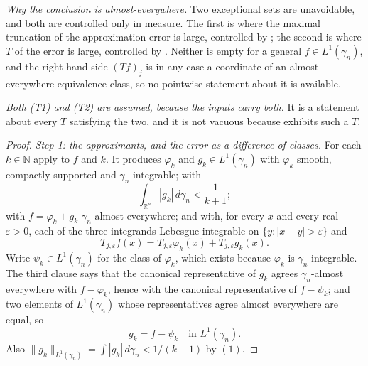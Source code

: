 \begin{lemma}
\emph{Why the conclusion is almost-everywhere.}  Two exceptional sets are
unavoidable, and both are controlled only in measure.  The first is where the
maximal truncation of the approximation error is large, controlled by
; the second is where $T$ of the error is
large, controlled by .  Neither is empty for a
general $f \in L^1(\gamma_n)$, and the right-hand side $(Tf)_j$ is in any case
a coordinate of an almost-everywhere equivalence class, so no pointwise
statement about it is available.

\emph{Both (T1) and (T2) are assumed, because the inputs carry both.}  It is a
statement about every $T$ satisfying the two, and it is not vacuous because
 exhibits such a $T$.
\end{lemma}
\begin{proof}
\emph{Step 1: the approximants, and the error as a difference of classes.}
For each $k \in \mathbb{N}$ apply  to
$f$ and $k$.  It produces $\varphi_k$ and $g_k \in L^1(\gamma_n)$ with
$\varphi_k$ smooth, compactly supported and $\gamma_n$-integrable; with
\begin{equation*}
  \int_{\mathbb{R}^n}|g_k|\,d\gamma_n < \frac1{k+1} ; \tag{1}
\end{equation*}
with $f = \varphi_k + g_k$ $\gamma_n$-almost everywhere; and with, for every
$x$ and every real $\varepsilon > 0$, each of the three integrands Lebesgue
integrable on $\{y : |x-y| > \varepsilon\}$ and
\begin{equation*}
  T_{j,\varepsilon}f(x)
    = T_{j,\varepsilon}\varphi_k(x) + T_{j,\varepsilon}g_k(x) . \tag{2}
\end{equation*}
Write $\psi_k \in L^1(\gamma_n)$ for the class of $\varphi_k$, which exists
because $\varphi_k$ is $\gamma_n$-integrable.  The third clause says that the
canonical representative of $g_k$ agrees $\gamma_n$-almost everywhere with
$f - \varphi_k$, hence with the canonical representative of $f - \psi_k$; and
two elements of $L^1(\gamma_n)$ whose representatives agree almost everywhere
are equal, so
\begin{equation*}
  g_k = f - \psi_k \quad\text{in } L^1(\gamma_n) . \tag{3}
\end{equation*}
Also $\|g_k\|_{L^1(\gamma_n)} = \int|g_k|\,d\gamma_n < 1/(k+1)$ by $(1)$.


\end{proof}
